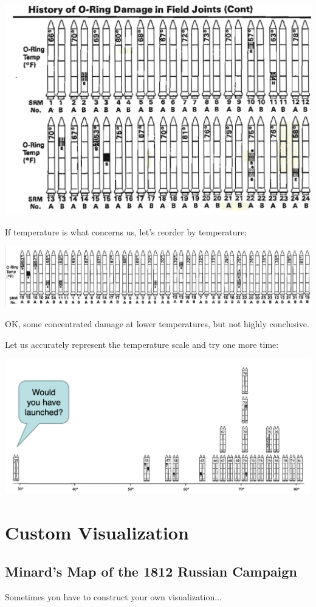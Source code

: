 \documentclass[11pt]{article}
\theoremstyle{definition}
\begin{document}
\includegraphics[width=\textwidth]{34.png}

If temperature is what concerns us, let’s reorder by
temperature:

\includegraphics[width=\textwidth]{35.png}

OK, some
concentrated
damage at lower
temperatures, but not
highly conclusive.

Let us accurately represent the temperature scale and
try one more time:

\includegraphics[width=\textwidth/2]{36.png}

\section{Custom Visualization}

\subsection{Minard’s Map of the 1812 Russian Campaign}
Sometimes you have to construct your own visualization...
\end{document}
